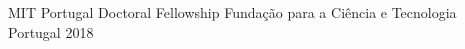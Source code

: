 

%
%
%




\begin{cvhonors}

  \cvhonor
    {MIT Portugal Doctoral Fellowship} %
    {Fundação para a Ciência e Tecnologia} %
    {Portugal} %
    {2018} %

\end{cvhonors}
